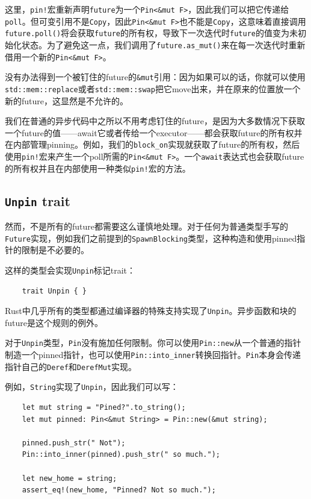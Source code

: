 这里，\texttt{pin!}宏重新声明\texttt{future}为一个\texttt{Pin<\&mut F>}，因此我们可以把它传递给\texttt{poll}。但可变引用不是\texttt{Copy}，因此\texttt{Pin<\&mut F>}也不能是\texttt{Copy}，这意味着直接调用\texttt{future.poll()}将会获取\texttt{future}的所有权，导致下一次迭代时\texttt{future}的值变为未初始化状态。为了避免这一点，我们调用了\texttt{future.as\_mut()}来在每一次迭代时重新借用一个新的\texttt{Pin<\&mut F>}。

没有办法得到一个被钉住的future的\texttt{\&mut}引用：因为如果可以的话，你就可以使用\\
\texttt{std::mem::replace}或者\texttt{std::mem::swap}把它move出来，并在原来的位置放一个新的future，这显然是不允许的。

我们在普通的异步代码中之所以不用考虑钉住的future，是因为大多数情况下获取一个future的值——await它或者传给一个executor——都会获取future的所有权并在内部管理pinning。例如，我们的\texttt{block\_on}实现就获取了future的所有权，然后使用\texttt{pin!}宏来产生一个poll所需的\texttt{Pin<\&mut F>}。一个\texttt{await}表达式也会获取future的所有权并且在内部使用一种类似\texttt{pin!}宏的方法。

\subsection{\texttt{Unpin} trait}
然而，不是所有的future都需要这么谨慎地处理。对于任何为普通类型手写的\texttt{Future}实现，例如我们之前提到的\texttt{SpawnBlocking}类型，这种构造和使用pinned指针的限制是不必要的。

这样的类型会实现\texttt{Unpin}标记trait：
\begin{verbatim}
    trait Unpin { }
\end{verbatim}

Rust中几乎所有的类型都通过编译器的特殊支持实现了\texttt{Unpin}。异步函数和块的future是这个规则的例外。

对于\texttt{Unpin}类型，\texttt{Pin}没有施加任何限制。你可以使用\texttt{Pin::new}从一个普通的指针制造一个pinned指针，也可以使用\texttt{Pin::into\_inner}转换回指针。\texttt{Pin}本身会传递指针自己的\texttt{Deref}和\texttt{DerefMut}实现。

例如，\texttt{String}实现了\texttt{Unpin}，因此我们可以写：
\begin{verbatim}
    let mut string = "Pined?".to_string();
    let mut pinned: Pin<&mut String> = Pin::new(&mut string);

    pinned.push_str(" Not");
    Pin::into_inner(pinned).push_str(" so much.");

    let new_home = string;
    assert_eq!(new_home, "Pinned? Not so much.");
\end{verbatim}


